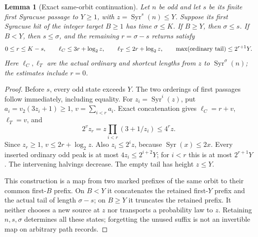 \documentclass[11pt]{article}
\newtheorem{lemma}[proposition]{Lemma}
\theoremstyle{remark}\newtheorem{remark}[proposition]{Remark}
\newcommand{\Syr}{\operatorname{Syr}}
\begin{document}
\begin{lemma}[Exact same-orbit continuation]
\label{lem:shaik-same-orbit-tail}
Let \(n\) be odd and let \(s\) be its finite first Syracuse
passage to \(Y\ge1\), with \(z=\Syr^s(n)\le Y\).
Suppose its first Syracuse hit of the integer target \(B\ge1\)
has time \(\sigma\le K\).
If \(B\ge Y\), then \(\sigma\le s\). If \(B<Y\), then
\(s\le\sigma\), and the remaining \(r=\sigma-s\) returns satisfy
\begin{equation}\label{eq:shaik-exact-tail}
 0\le r\le K-s,\qquad
 \ell_C\le3r+\log_2 z,\qquad
 \ell_T\le2r+\log_2 z,\qquad
 \max({\rm ordinary\ tail})\le2^{r+1}Y.
\end{equation}
Here \(\ell_C,\ell_T\) are the actual ordinary and shortcut lengths
from \(z\) to \(\Syr^\sigma(n)\); the estimates include \(r=0\).
\end{lemma}
\begin{proof}
Before \(s\), every odd state exceeds \(Y\). The two orderings of
first passages follow immediately, including equality.
For \(z_i=\Syr^i(z)\), put
\(a_i=v_2(3z_i+1)\ge1\), \(v=\sum_{i<r}a_i\).
Exact concatenation gives \(\ell_C=r+v\), \(\ell_T=v\), and
\[
 2^v z_r=z\prod_{i<r}(3+1/z_i)\le4^rz.
\]
Since \(z_r\ge1\), \(v\le2r+\log_2z\).
Also \(z_i\le2^iz\), because \(\Syr(x)\le2x\).
Every inserted ordinary odd peak is at most
\(4z_i\le2^{i+2}Y\); for \(i<r\) this is at most \(2^{r+1}Y\).
The intervening halvings decrease. The empty tail has height \(z\le Y\).

This construction is a map from two marked prefixes of the same
orbit to their common first-\(B\) prefix. On \(B<Y\) it concatenates
the retained first-\(Y\) prefix and the actual tail of length
\(\sigma-s\); on \(B\ge Y\) it truncates the retained prefix.
It neither chooses a new source at \(z\) nor transports a probability
law to \(z\). Retaining \(n,s,\sigma\) determines all these states;
forgetting the unused suffix is not an invertible map on arbitrary
path records.
\end{proof}
\end{document}
